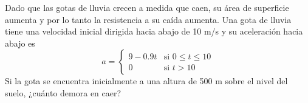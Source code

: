 \item Dado que las gotas de lluvia crecen a medida que caen, su área de superficie aumenta y por lo tanto la resistencia a su caída aumenta. Una gota de lluvia tiene una velocidad inicial dirigida hacia abajo de 10 m/s y su aceleración hacia abajo es $$a = \begin{cases} 9 - 0.9t & \text{si } 0 \le t \le 10 \\ 0 & \text{si } t > 10 \end{cases}$$ Si la gota se encuentra inicialmente a una altura de 500 m sobre el nivel del suelo, ¿cuánto demora en caer?
